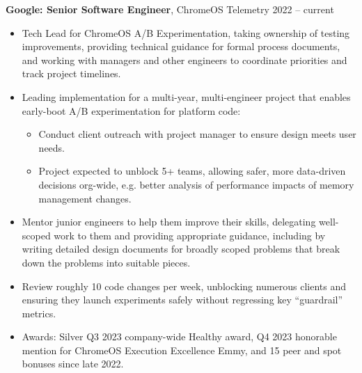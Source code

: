 \documentclass[overlapped]{res}
\newcommand{\experience}[5]{
    \textbf{#3}, #4 \hfill #1 -- #2 \\
    #5
}
\begin{document}
\begin{resume}
  \experience{2022}{current}{Google: Senior Software Engineer}{ChromeOS Telemetry}{
    \begin{itemize} \itemsep -1pt
        \item Tech Lead for ChromeOS A/B Experimentation, taking ownership of
          testing improvements, providing technical guidance for formal process
          documents, and working with managers and other engineers to
          coordinate priorities and track project timelines.
        \item Leading implementation for a multi-year, multi-engineer project
          that enables early-boot A/B experimentation for platform code:
          \vspace{-0.5em}
          \begin{itemize} \itemsep -1pt
              \item Conduct client outreach with project manager to ensure
                design meets user needs.
              \item Project expected to unblock 5+ teams, allowing safer, more
                data-driven decisions org-wide, e.g. better analysis of
                performance impacts of memory management changes.
          \end{itemize}
        \item Mentor junior engineers to help them improve their skills,
          delegating well-scoped work to them and providing appropriate
          guidance, including by writing detailed design documents for broadly
          scoped problems that break down the problems into suitable pieces.
        \item Review roughly 10 code changes per week, unblocking numerous
          clients and ensuring they launch experiments safely without regressing
          key ``guardrail'' metrics.
        \item Awards: Silver Q3 2023 company-wide Healthy award, Q4 2023
          honorable mention for ChromeOS Execution Excellence Emmy, and 15 peer
          and spot bonuses since late 2022.
    \end{itemize}}


\end{resume}
\end{document}

